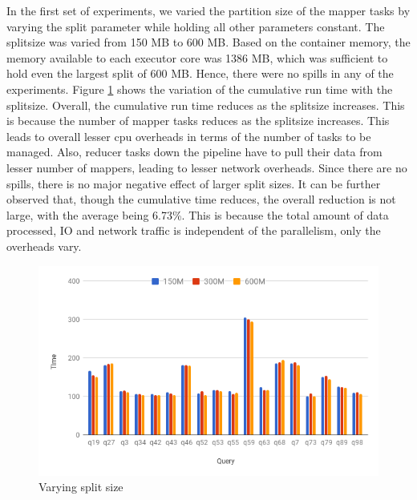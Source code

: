 In the first set of experiments, we varied the partition size of the mapper tasks by varying the split parameter while holding all other parameters constant. The splitsize was varied from 150 MB to 600 MB. Based on the container memory, the memory available to each executor core was 1386 MB, which was sufficient to hold even the largest split of 600 MB. Hence, there were no spills in any of the experiments. Figure \ref{fig:varysplitsize} shows the variation of the cumulative run time with the splitsize. Overall, the cumulative run time reduces as the splitsize increases. This is because the number of mapper tasks reduces as the splitsize increases. This leads to overall lesser cpu overheads in terms of the number of tasks to be managed. Also, reducer tasks down the pipeline have to pull their data from lesser number of mappers, leading to lesser network overheads. Since there are no spills, there is no major negative effect of larger split sizes. It can be further observed that, though the cumulative time reduces, the overall reduction is not large, with the average being 6.73\%. This is because the total amount of data processed, IO and network traffic is independent of the parallelism, only the overheads vary. 

\begin{figure}[h]
	\includegraphics[width=\linewidth]{fig/varysplitsize.png}
	\caption{Varying split size}
	\label{fig:varysplitsize}
\end{figure}


